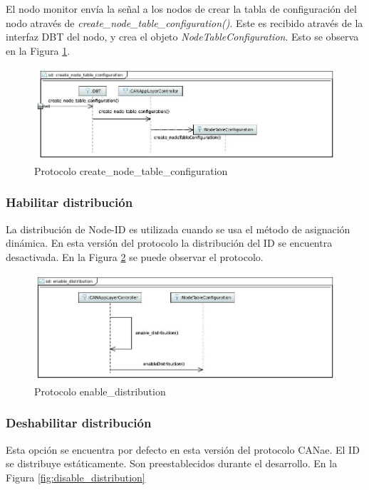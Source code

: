 El nodo monitor envía la señal a los nodos de crear la tabla de configuración
del nodo através de \textit{create\_node\_table\_configuration()}. Este es
recibido através de la interfaz DBT del nodo, y crea el objeto
\textit{NodeTableConfiguration}. Esto se observa en la Figura
\ref{fig:createNodeTableConfiguration}.

\begin{figure}[h!]
 \centering
 \includegraphics[scale=0.4]{images/Secciones/AppendixA/create_node_table_configuration.JPG}
  \caption{Protocolo create\_node\_table\_configuration}
\label{fig:createNodeTableConfiguration}
\end{figure} 

\subsubsection{Habilitar distribución}
La distribución de Node-ID es utilizada cuando se usa el método de
asignación dinámica. En esta versión del protocolo la distribución del ID se
encuentra desactivada. En la Figura \ref{fig:enable_distribution} se puede
observar el protocolo.

\begin{figure}[h!]
 \centering
 \includegraphics[scale=0.4]{images/Secciones/AppendixA/enableDistribution.JPG}
  \caption{Protocolo enable\_distribution}
\label{fig:enable_distribution}
\end{figure}

\subsubsection{Deshabilitar distribución}
Esta opción se encuentra por defecto en esta versión del protocolo CANae. El ID
se distribuye estáticamente. Son preestablecidos durante el desarrollo. En la
Figura \ref{fig:disable_distribution}

